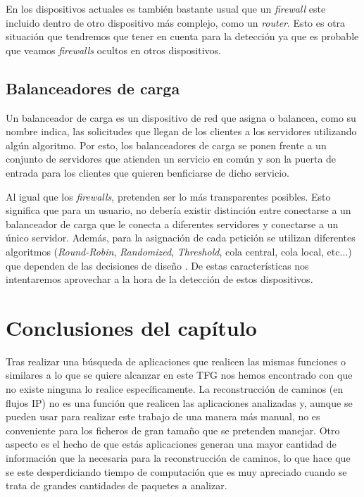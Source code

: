 \documentclass[twoside, 12pt]{epstfg}
\begin{document}
En los dispositivos actuales es también bastante usual que un \textit{firewall} este incluido dentro de otro dispositivo más complejo, como un \textit{router}. Esto es otra situación que tendremos que tener en cuenta para la detección ya que es probable que veamos \textit{firewalls} ocultos en otros dispositivos.

\subsection{Balanceadores de carga}
Un balanceador de carga es un dispositivo de red que asigna o balancea, como su nombre indica, las solicitudes que llegan de los clientes a los servidores utilizando algún algoritmo. Por esto, los balanceadores de carga se ponen frente a un conjunto de servidores que atienden un servicio en común y son la puerta de entrada para los clientes que quieren benficiarse de dicho servicio. 

Al igual que los \textit{firewalls}, pretenden ser lo más transparentes posibles. Esto significa que para un usuario, no debería existir distinción entre conectarse a un balanceador de carga que le conecta a diferentes servidores y conectarse a un único servidor. Además, para la asignación de cada petición se utilizan diferentes algoritmos (\textit{Round-Robin}, \textit{Randomized}, \textit{Threshold}, cola central, cola local, etc...) que dependen de las decisiones de diseño \cite{Wadhwa2014}. De estas características nos intentaremos aprovechar a la hora de la detección de estos dispositivos. 

\section{Conclusiones del capítulo}
Tras realizar una búsqueda de aplicaciones que realicen las mismas funciones o similares a lo que se quiere alcanzar en este TFG nos hemos encontrado con que no existe ninguna lo realice específicamente. La reconstrucción de caminos (en flujos IP) no es una función que realicen las aplicaciones analizadas y, aunque se pueden usar para realizar este trabajo de una manera más manual, no es conveniente para los ficheros de gran tamaño que se pretenden manejar. Otro aspecto es el hecho de que estás aplicaciones generan una mayor cantidad de información que la necesaria para la reconstrucción de caminos, lo que hace que se este desperdiciando tiempo de computación que es muy apreciado cuando se trata de grandes cantidades de paquetes a analizar.
\end{document}
